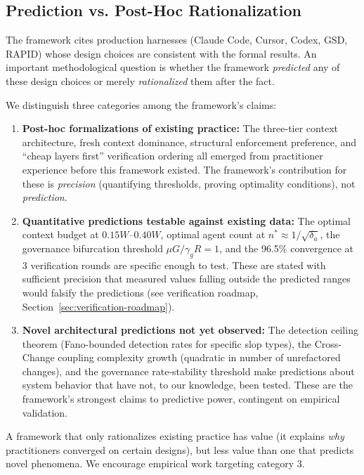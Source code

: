 \documentclass[11pt, a4paper, logo, copyright]{googledeepmind}
\begin{document}
\subsection{Prediction vs. Post-Hoc Rationalization}

The framework cites production harnesses (Claude Code, Cursor, Codex, GSD, RAPID) whose design choices are consistent with the formal results. An important methodological question is whether the framework \emph{predicted} any of these design choices or merely \emph{rationalized} them after the fact.

We distinguish three categories among the framework's claims:

\begin{enumerate}[nosep]
    \item \textbf{Post-hoc formalizations of existing practice:} The three-tier context architecture, fresh context dominance, structural enforcement preference, and ``cheap layers first'' verification ordering all emerged from practitioner experience before this framework existed. The framework's contribution for these is \emph{precision} (quantifying thresholds, proving optimality conditions), not \emph{prediction}.

    \item \textbf{Quantitative predictions testable against existing data:} The optimal context budget at $0.15W$--$0.40W$, optimal agent count at $n^* \approx 1/\sqrt{\delta_a}$, the governance bifurcation threshold $\mu G / \gamma_g R = 1$, and the 96.5\% convergence at 3 verification rounds are specific enough to test. These are stated with sufficient precision that measured values falling outside the predicted ranges would falsify the predictions (see verification roadmap, Section~\ref{sec:verification-roadmap}).

    \item \textbf{Novel architectural predictions not yet observed:} The detection ceiling theorem (Fano-bounded detection rates for specific slop types), the Cross-Change coupling complexity growth (quadratic in number of unrefactored changes), and the governance rate-stability threshold make predictions about system behavior that have not, to our knowledge, been tested. These are the framework's strongest claims to predictive power, contingent on empirical validation.
\end{enumerate}

A framework that only rationalizes existing practice has value (it explains \emph{why} practitioners converged on certain designs), but less value than one that predicts novel phenomena. We encourage empirical work targeting category 3.
\end{document}

